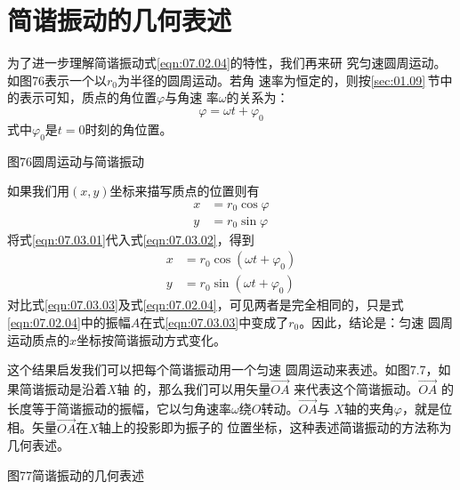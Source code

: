 \section{简谐振动的几何表述}\label{sec:07.03}

为了进一步理解简谐振动\lhbrak 式\eqref{eqn:07.02.04}\rhbrak 的特性，我们再来研
究匀速圆周运动。如图76表示一个以$ r _ { 0 } $为半径的圆周运动。若角
速率为恒定的，则按\ref{sec:01.09}\,节中的表示可知，质点的角位置$ \varphi $与角速
率$ \omega $的关系为：
\begin{equation}\label{eqn:07.03.01}
	\varphi = \omega t + \varphi _ { 0 }
\end{equation}
式中$ \varphi _ { 0 } $是$  t = 0   $时刻的角位置。

图76圆周运动与简谐振动

如果我们用$ \left(x, y\right) $坐标来描写质点的位置则有
\begin{equation}\label{eqn:07.03.02}
	\begin{aligned}
	x &= r _ { 0 } \cos \varphi  \\
	y &= r _ { 0 } \sin \varphi
	\end{aligned}
\end{equation}
将式\eqref{eqn:07.03.01}代入式\eqref{eqn:07.03.02}，得到
\begin{equation}\label{eqn:07.03.03}
    \begin{aligned}
    x &= r _ { 0 } \cos \left( \omega t + \varphi _ { 0 } \right) \\
    y &= r _ { 0 } \sin \left( \omega t + \varphi _ { 0 } \right)
\end{aligned}
\end{equation}
对比式\eqref{eqn:07.03.03}及式\eqref{eqn:07.02.04}，可见两者是完全相同的，只是式
\eqref{eqn:07.02.04}中的振幅$ A $在式\eqref{eqn:07.03.03}中变成了$ r _ { 0 } $。因此，结论是：匀速
圆周运动质点的$ x $坐标按简谐振动方式变化。

这个结果启发我们可以把每个简谐振动用一个匀速
圆周运动来表述。如图7.7，如果简谐振动是沿着$ X $轴
的，那么我们可以用矢量$ \vec{ OA } $
来代表这个简谐振动。$ \vec{ OA } $
的长度等于简谐振动的振幅，它以匀角速率$ \omega $绕$ O $转动。$ \vec{ OA } $与
$ X $轴的夹角$ \varphi $，就是位相。矢量$ \vec{ OA } $在$ X $轴上的投影即为振子的
位置坐标，这种表述简谐振动的方法称为几何表述。

图77简谐振动的几何表述
